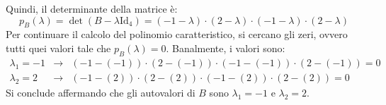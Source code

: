 \documentclass[a4paper]{article}
\begin{document}
	Quindi, il determinante della matrice è:
	\begin{equation*}
		p_{B}\left(\lambda\right) = \det\left(B - \lambda \mathrm{Id}_{4}\right) = \left(-1-\lambda\right) \cdot \left(2-\lambda\right) \cdot \left(-1-\lambda\right) \cdot \left(2-\lambda\right)
	\end{equation*}
	Per continuare il calcolo del polinomio caratteristico, si cercano gli zeri, ovvero tutti quei valori tale che $p_{B}\left(\lambda\right) = 0$. Banalmente, i valori sono:
	\begin{equation*}
		\begin{array}{lll}
			\lambda_{1} = -1 &\longrightarrow& \left(-1-\left(-1\right)\right) \cdot \left(2-\left(-1\right)\right) \cdot \left(-1-\left(-1\right)\right) \cdot \left(2-\left(-1\right)\right) = 0 \\[.5em]
			\lambda_{2} = 2  &\longrightarrow& \left(-1-\left(2\right)\right) \cdot \left(2-\left(2\right)\right) \cdot \left(-1-\left(2\right)\right) \cdot \left(2-\left(2\right)\right) = 0
		\end{array}
	\end{equation*}
	Si conclude affermando che gli autovalori di $B$ sono $\lambda_{1} = -1$ e $\lambda_{2} = 2$.\newpage
\end{document}
